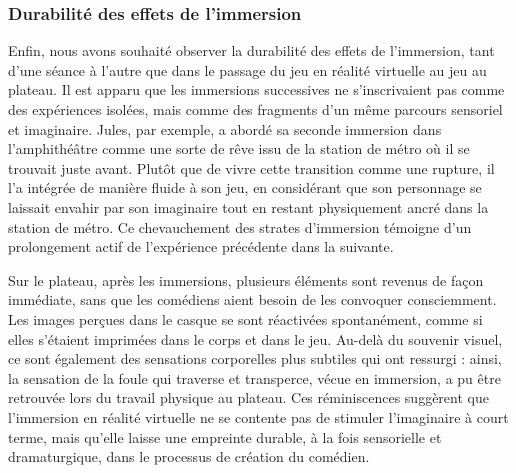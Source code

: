 \subsubsection{Durabilité des effets de l'immersion}
Enfin, nous avons souhaité observer la durabilité des effets de l’immersion, tant d’une séance à l’autre que dans le passage du jeu en réalité virtuelle au jeu au plateau. Il est apparu que les immersions 
successives ne s’inscrivaient pas comme des expériences isolées, mais comme des fragments d’un même parcours sensoriel et imaginaire. Jules, par exemple, a abordé sa seconde immersion dans l’amphithéâtre 
comme une sorte de rêve issu de la station de métro où il se trouvait juste avant. Plutôt que de vivre cette transition comme une rupture, il l’a intégrée de manière fluide à son jeu, en considérant que son personnage 
se laissait envahir par son imaginaire tout en restant physiquement ancré dans la station de métro. Ce chevauchement des strates d’immersion témoigne d’un prolongement actif de l’expérience précédente dans la suivante.

Sur le plateau, après les immersions, plusieurs éléments sont revenus de façon immédiate, sans que les comédiens aient besoin de les convoquer consciemment. Les images perçues dans le casque se sont réactivées spontanément, 
comme si elles s’étaient imprimées dans le corps et dans le jeu. Au-delà du souvenir visuel, ce sont également des sensations corporelles plus subtiles qui ont ressurgi : ainsi, la sensation de la foule qui traverse et transperce,
 vécue en immersion, a pu être retrouvée lors du travail physique au plateau. Ces réminiscences suggèrent que l'immersion en réalité virtuelle ne se contente pas de stimuler l'imaginaire à court terme, mais qu'elle laisse une 
 empreinte durable, à la fois sensorielle et dramaturgique, dans le processus de création du comédien.
 \\

